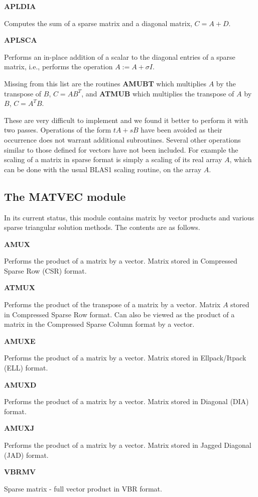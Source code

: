 \documentclass[12pt]{article}
\def\marg#1{\parbox[b]{1.3in}{\bf #1}}
\def\disp#1{\parbox[t]{4.62in}{#1} \vskip 0.2in }
\begin{document}
\marg{ APLDIA }\disp{   Computes the sum of a sparse matrix and a 
diagonal matrix, $ C = A + D $.  }

\marg{ APLSCA }\disp{Performs an in-place
addition of a scalar to the diagonal entries of 
a sparse matrix, i.e., performs the operation
 $A := A + \sigma I$.} 

\vskip 0.3in 

Missing from this list are the routines {\bf AMUBT} which multiplies $A$ by 
the transpose of $B$, $C= AB^T$, and {\bf ATMUB } which multiplies the 
transpose of $A$ by $B$,	$C= A^T B $.

\vskip 0.3in

These are very difficult to implement and we found it better to 
perform it with two passes.
Operations of the form $ t A + s B $ have been
avoided as their occurrence does not warrant additional subroutines.
Several other operations similar to those defined for
vectors have not been included. For example the scaling
of a matrix  in sparse format is simply a scaling of its
real array $A$, which can be done with the usual BLAS1
scaling routine, on the array $A$. 


\subsection{The MATVEC module}
In its current status, this module contains matrix
by vector products and various sparse triangular 
solution methods. The contents are as follows.

\vskip 0.3in

\marg{ AMUX   }\disp{ Performs the product of a  matrix by a vector.
 Matrix stored in  Compressed Sparse Row (CSR) format.}

\marg{  ATMUX  }\disp{  Performs the product of the transpose of
a  matrix by a vector. Matrix $A$ stored in Compressed 
Sparse Row format. Can also be
viewed as the product of a matrix in the Compressed Sparse Column
format by a vector.} 

\marg{  AMUXE  }\disp{  Performs the product of a  matrix by a vector.
Matrix stored in  Ellpack/Itpack (ELL) format.}

\marg{ AMUXD  }\disp{  Performs the product of a  matrix by a vector.
Matrix stored in  Diagonal (DIA) format.}

\marg{ AMUXJ  }\disp{  Performs the product of a  matrix by a vector.
Matrix stored in  Jagged Diagonal (JAD) format.} 

\marg{ VBRMV }\disp{ Sparse matrix - full vector product in VBR format.} 
\end{document}
